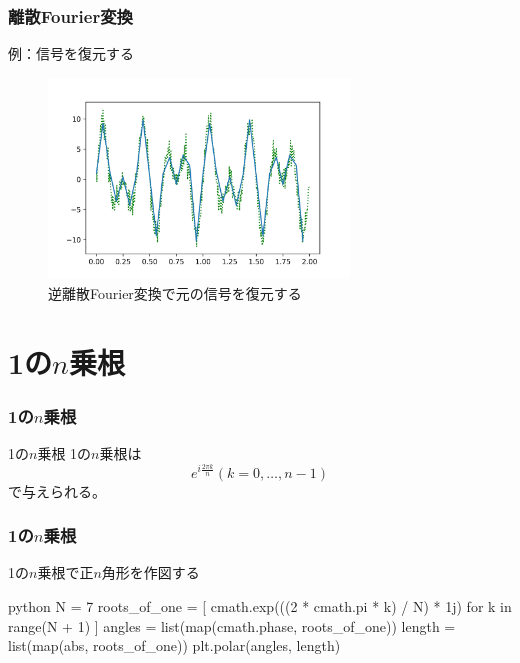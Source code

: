 \documentclass[dvipdfmx,11pt,notheorems]{beamer}
\theoremstyle{definition}
\begin{document}
\begin{frame}[fragile]\frametitle{離散Fourier変換}

\begin{block}{例：信号を復元する}
\begin{figure}
  \centering
  \includegraphics[width=8cm]{recover.png}
  \caption{逆離散Fourier変換で元の信号を復元する}
\end{figure}

\end{block}
\end{frame}



\section{1の$n$乗根}

\begin{frame}[fragile]\frametitle{1の$n$乗根}

\begin{block}{1の$n$乗根}
1の$n$乗根は
\begin{equation*}
e^{i \frac{2\pi k}{n}}(k=0, \dots , n-1)
\end{equation*}
で与えられる。
\end{block}

\end{frame}

\begin{frame}[fragile]\frametitle{1の$n$乗根}
\begin{exampleblock}{1の$n$乗根で正$n$角形を作図する}
\begin{pygments}{python}
N = 7
roots_of_one = [
    cmath.exp(((2 * cmath.pi * k) / N) * 1j) 
    for k in range(N + 1)
]
angles = list(map(cmath.phase, roots_of_one))
length = list(map(abs, roots_of_one))
plt.polar(angles, length)
\end{pygments}
\end{exampleblock}

\end{frame}
\end{document}
